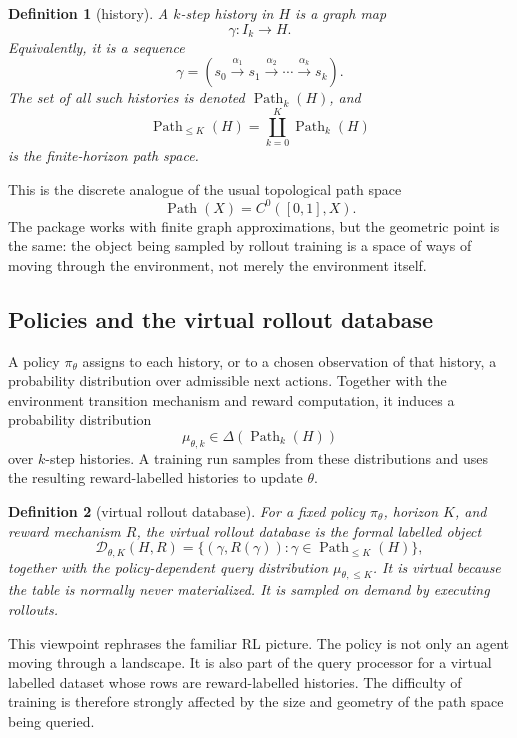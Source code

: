 \documentclass[11pt]{article}
\newtheorem{definition}{Definition}[section]
\newcommand{\Path}{\operatorname{Path}}
\begin{document}
\begin{definition}[history]
A \(k\)-step history in \(H\) is a graph map
\[
    \gamma:I_k\to H.
\]
Equivalently, it is a sequence
\[
    \gamma=(s_0\xrightarrow{\alpha_1}s_1\xrightarrow{\alpha_2}\cdots\xrightarrow{\alpha_k}s_k).
\]
The set of all such histories is denoted \(\Path_k(H)\), and
\[
    \Path_{\le K}(H)=\coprod_{k=0}^{K}\Path_k(H)
\]
is the finite-horizon path space.
\end{definition}

This is the discrete analogue of the usual topological path space
\[
    \Path(X)=C^0([0,1],X).
\]
The package works with finite graph approximations, but the geometric point is the same: the object being sampled by rollout training is a space of ways of moving through the environment, not merely the environment itself.

\subsection{Policies and the virtual rollout database}

A policy \(\pi_\theta\) assigns to each history, or to a chosen observation of that history, a probability distribution over admissible next actions.  Together with the environment transition mechanism and reward computation, it induces a probability distribution
\[
    \mu_{\theta,k}\in \Delta(\Path_k(H))
\]
over \(k\)-step histories.  A training run samples from these distributions and uses the resulting reward-labelled histories to update \(\theta\).

\begin{definition}[virtual rollout database]
For a fixed policy \(\pi_\theta\), horizon \(K\), and reward mechanism \(R\), the virtual rollout database is the formal labelled object
\[
    \mathcal{D}_{\theta,K}(H,R)=\{(\gamma,R(\gamma)):\gamma\in \Path_{\le K}(H)\},
\]
together with the policy-dependent query distribution \(\mu_{\theta,\le K}\).  It is virtual because the table is normally never materialized.  It is sampled on demand by executing rollouts.
\end{definition}

This viewpoint rephrases the familiar RL picture.  The policy is not only an agent moving through a landscape.  It is also part of the query processor for a virtual labelled dataset whose rows are reward-labelled histories.  The difficulty of training is therefore strongly affected by the size and geometry of the path space being queried.
\end{document}
